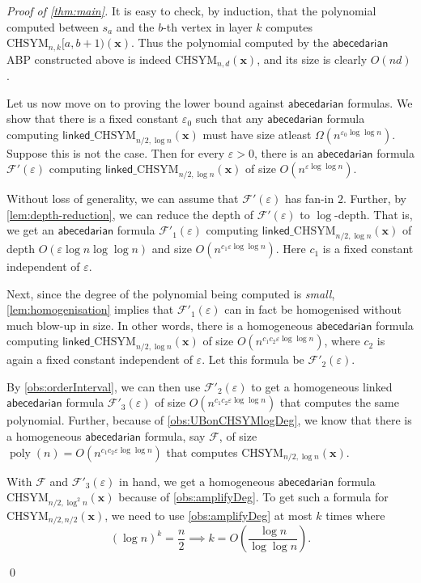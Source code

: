 \documentclass[10pt,a4paper]{article}
\def\poly{\operatorname{poly}}
\def\inparen#1{\left( #1 \right)}
\def\vecx{\mathbf{x}}
\newcommand{\form}{\textbf{$\mathcal{F}$}}
\renewcommand{\epsilon}{\varepsilon}
\newcommand{\abcd}{\mathsf{abecedarian}}
\newcommand{\chsym}[2]{\mathrm{CHSYM}_{#1,#2}}
\newcommand{\lchsym}[2]{\mathrm{\mathsf{linked}\_CHSYM}_{#1,#2}}
\newenvironment{proofof}[1]{\medskip\noindent\emph{Proof of #1.}\hspace*{1em}}{\qed\bigskip}
\begin{document}
\begin{proofof}{\autoref{thm:main}}
	It is easy to check, by induction, that the polynomial computed between $s_a$ and the $b$-th vertex in layer $k$ computes $\chsym{n}{k}[a,b+1)(\vecx)$. 
	Thus the polynomial computed by the $\abcd$ ABP constructed above is indeed $\chsym{n}{d}(\vecx)$, and its size is clearly $O(nd)$.
	
	Let us now move on to proving the lower bound against $\abcd$ formulas.
	We show that there is a fixed constant $\epsilon_0$ such that any $\abcd$ formula computing $\lchsym{n/2}{\log n}(\vecx)$ must have size atleast $\Omega(n^{\epsilon_0 \log \log n})$.
	Suppose this is not the case. 
	Then for every $\epsilon > 0$, there is an $\abcd$ formula $\form'(\epsilon)$ computing $\lchsym{n/2}{\log n}(\vecx)$ of size $O(n^{\epsilon \log \log n})$.
	
	Without loss of generality, we can assume that $\form'(\epsilon)$ has fan-in $2$.
	Further, by \autoref{lem:depth-reduction}, we can reduce the depth of $\form'(\epsilon)$ to $\log$-depth.
	That is, we get an $\abcd$ formula $\form'_1(\epsilon)$ computing $\lchsym{n/2}{\log n}(\vecx)$ of depth $O(\epsilon \log n \log \log n)$ and size $O(n^{c_1 \epsilon \log \log n})$.
	Here $c_1$ is a fixed constant independent of $\epsilon$. 

	Next, since the degree of the polynomial being computed is \emph{small}, \autoref{lem:homogenisation} implies that $\form'_1(\epsilon)$ can in fact be homogenised without much blow-up in size. 
	In other words, there is a homogeneous $\abcd$ formula computing $\lchsym{n/2}{\log n}(\vecx)$ of size $O(n^{c_1 c_2 \epsilon \log \log n})$, where $c_2$ is again a fixed constant independent of $\epsilon$. 
	Let this formula be $\form'_2(\epsilon)$.

	By \autoref{obs:orderInterval}, we can then use $\form'_2(\epsilon)$ to get a homogeneous linked $\abcd$ formula $\form'_3(\epsilon)$ of size $O(n^{c_1 c_2 \epsilon \log \log n})$ that computes the same polynomial.
	Further, because of \autoref{obs:UBonCHSYMlogDeg}, we know that there is a homogeneous $\abcd$ formula, say $\form$, of size $\poly(n) = O(n^{c_1 c_2 \epsilon \log \log n})$ that computes $\chsym{n/2}{\log n}(\vecx)$.
	
	With $\form$ and $\form'_3(\epsilon)$ in hand, we get a homogeneous $\abcd$ formula $\chsym{n/2}{\log^2 n}(\vecx)$ because of \autoref{obs:amplifyDeg}.
	To get such a formula for $\chsym{n/2}{n/2}(\vecx)$, we need to use \autoref{obs:amplifyDeg} at most $k$ times where 
	\[
		(\log n)^k = \frac{n}{2} \implies k = O \inparen{\frac{\log n}{\log \log n}}.
	\]


\end{proofof}
\end{document}
